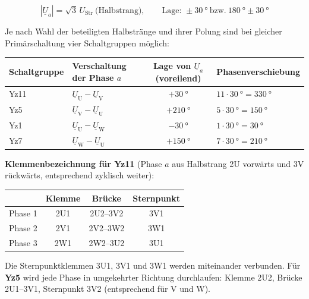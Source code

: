 \begin{center}
\end{center}

\begin{equation*}
  |\underline{U}_a| = \sqrt{3}\,U_\mathrm{Str}\ \text{(Halbstrang)}, \qquad
  \text{Lage: } \pm\SI{30}{\degree}\ \text{bzw.}\ \SI{180}{\degree}\pm\SI{30}{\degree}
\end{equation*}

Je nach Wahl der beteiligten Halbstränge und ihrer Polung sind bei gleicher Primärschaltung vier Schaltgruppen möglich:

\begin{center}
\begin{tabular}{@{}llcl@{}}
\toprule
Schaltgruppe & Verschaltung der Phase $a$ & Lage von $\underline{U}_a$ (voreilend) & Phasenverschiebung\\
\midrule
Yz11 & $\underline{U}_\mathrm{U}-\underline{U}_\mathrm{V}$ & $+\SI{30}{\degree}$  & $11\cdot\SI{30}{\degree}=\SI{330}{\degree}$\\
Yz5  & $\underline{U}_\mathrm{V}-\underline{U}_\mathrm{U}$ & $+\SI{210}{\degree}$ & $5\cdot\SI{30}{\degree}=\SI{150}{\degree}$\\
Yz1  & $\underline{U}_\mathrm{U}-\underline{U}_\mathrm{W}$ & $-\SI{30}{\degree}$  & $1\cdot\SI{30}{\degree}=\SI{30}{\degree}$\\
Yz7  & $\underline{U}_\mathrm{W}-\underline{U}_\mathrm{U}$ & $+\SI{150}{\degree}$ & $7\cdot\SI{30}{\degree}=\SI{210}{\degree}$\\
\bottomrule
\end{tabular}
\end{center}

\textbf{Klemmenbezeichnung für Yz11} (Phase $a$ aus Halbstrang 2U vorwärts und 3V rückwärts, entsprechend zyklisch weiter):
\begin{center}
\small
\begin{tabular}{@{}lccc@{}}
\toprule
 & Klemme & Brücke & Sternpunkt\\
\midrule
Phase 1 & 2U1 & 2U2--3V2 & 3V1\\
Phase 2 & 2V1 & 2V2--3W2 & 3W1\\
Phase 3 & 2W1 & 2W2--3U2 & 3U1\\
\bottomrule
\end{tabular}
\end{center}
Die Sternpunktklemmen 3U1, 3V1 und 3W1 werden miteinander verbunden. Für \textbf{Yz5} wird jede Phase in umgekehrter Richtung durchlaufen: Klemme 2U2, Brücke 2U1--3V1, Sternpunkt 3V2 (entsprechend für V und W).

